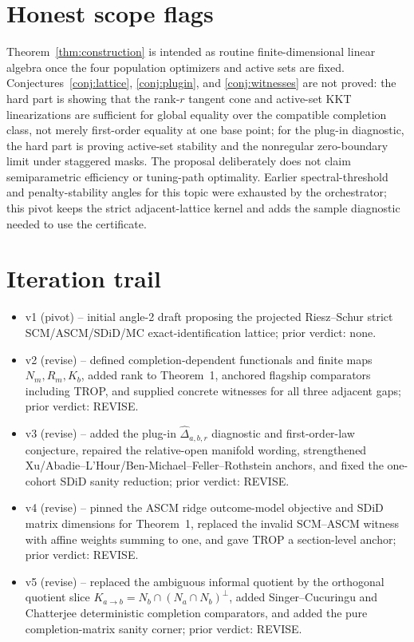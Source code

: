 \documentclass[11pt]{article}
\theoremstyle{definition}
\theoremstyle{plain}
\theoremstyle{remark}
\begin{document}
\section{Honest scope flags}
Theorem~\ref{thm:construction} is intended as routine finite-dimensional
linear algebra once the four population optimizers and active sets are fixed.
Conjectures~\ref{conj:lattice}, \ref{conj:plugin}, and
\ref{conj:witnesses} are not proved:
the hard part is showing that the rank-$r$ tangent cone and active-set KKT
linearizations are sufficient for global equality over the compatible
completion class, not merely first-order equality at one base point; for the
plug-in diagnostic, the hard part is proving active-set stability and the
nonregular zero-boundary limit under staggered masks. The proposal deliberately
does not claim semiparametric efficiency or tuning-path optimality. Earlier
spectral-threshold and penalty-stability angles for this topic were exhausted
by the orchestrator; this pivot keeps the strict adjacent-lattice kernel and
adds the sample diagnostic needed to use the certificate.

\section{Iteration trail}
\begin{itemize}[leftmargin=*]
\item v1 (pivot) -- initial angle-2 draft proposing the projected
Riesz--Schur strict SCM/ASCM/SDiD/MC exact-identification lattice; prior
verdict: none.
\item v2 (revise) -- defined completion-dependent functionals and finite
maps $N_m,R_m,K_b$, added rank to Theorem~1, anchored flagship comparators
including TROP, and supplied concrete witnesses for all three adjacent gaps;
prior verdict: REVISE.
\item v3 (revise) -- added the plug-in $\widehat\Delta_{a,b,r}$ diagnostic
and first-order-law conjecture, repaired the relative-open manifold wording,
strengthened Xu/Abadie--L'Hour/Ben-Michael--Feller--Rothstein anchors, and
fixed the one-cohort SDiD sanity reduction; prior verdict: REVISE.
\item v4 (revise) -- pinned the ASCM ridge outcome-model objective and SDiD
matrix dimensions for Theorem~1, replaced the invalid SCM--ASCM witness with
affine weights summing to one, and gave TROP a section-level anchor; prior
verdict: REVISE.
\item v5 (revise) -- replaced the ambiguous informal quotient by the
orthogonal quotient slice $K_{a\to b}=N_b\cap(N_a\cap N_b)^\perp$, added
Singer--Cucuringu and Chatterjee deterministic completion comparators, and
added the pure completion-matrix sanity corner; prior verdict: REVISE.
\end{itemize}
\end{document}
